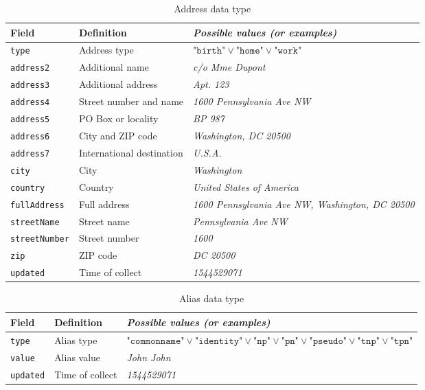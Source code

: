 \documentclass[twoside,twocolumn]{article}
\theoremstyle{definition}
\theoremstyle{remark}
\begin{document}
\begin{table*}
    \centering
    \caption{Address data type}
    \begin{tabular*}{\textwidth}{l|l||l}
        Field & Definition & \textit{Possible values (or examples)} \\
        \hline \hline
        \texttt{type} & Address type & $\texttt{"birth"} \vee \texttt{"home"} \vee \texttt{"work"}$ \\
        \hline
        \texttt{address2} & Additional name & \textit{c/o Mme Dupont} \\
        \hline
        \texttt{address3} & Additional address & \textit{Apt. 123} \\
        \hline
        \texttt{address4} & Street number and name & \textit{1600 Pennsylvania Ave NW} \\
        \hline
        \texttt{address5} & PO Box or locality & \textit{BP 987} \\
        \hline
        \texttt{address6} & City and ZIP code & \textit{Washington, DC 20500} \\
        \hline
        \texttt{address7} & International destination & \textit{U.S.A.} \\
        \hline
        \texttt{city} & City & \textit{Washington} \\
        \hline
        \texttt{country} & Country & \textit{United States of America} \\
        \hline
        \texttt{fullAddress} & Full address & \textit{1600 Pennsylvania Ave NW, Washington, DC 20500} \\
        \hline
        \texttt{streetName} & Street name & \textit{Pennsylvania Ave NW} \\
        \hline
        \texttt{streetNumber} & Street number & \textit{1600} \\
        \hline
        \texttt{zip} & ZIP code & \textit{DC 20500} \\
        \hline
        \texttt{updated} & Time of collect & \textit{1544529071}
        \label{table:address}
    \end{tabular*}
\end{table*}

\begin{table*}
    \centering
    \caption{Alias data type}
    \begin{tabular*}{1.05\textwidth}{l|l||l}
        Field & Definition & \textit{Possible values (or examples)} \\
        \hline \hline
        \texttt{type} & Alias type & $\texttt{"commonname"} \vee \texttt{"identity"} \vee \texttt{"np"} \vee \texttt{"pn"} \vee \texttt{"pseudo"} \vee \texttt{"tnp"} \vee \texttt{"tpn"}$ \\
        \hline
        \texttt{value} & Alias value & \textit{John John} \\
        \hline
        \texttt{updated} & Time of collect & \textit{1544529071}
        \label{table:aliases}
    \end{tabular*}
\end{table*}
\end{document}
